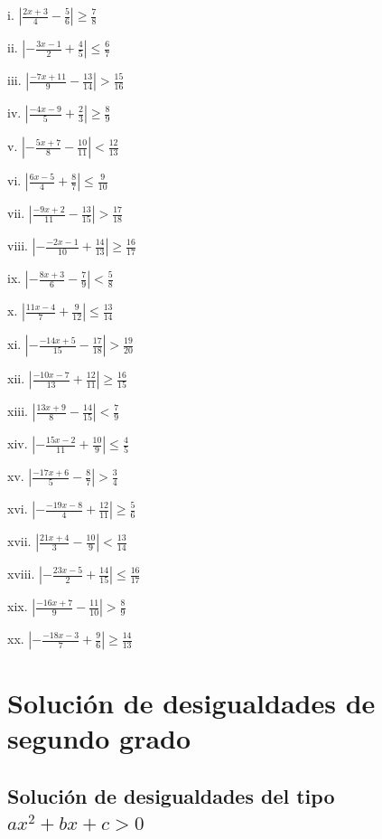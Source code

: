 \documentclass[]{book}
\begin{document}
\begin{multicols}{2}
    i. $|\frac{2x+3}{4}-\frac{5}{6}| \geq \frac{7}{8}$
    
    ii. $|-\frac{3x-1}{2}+\frac{4}{5}| \leq \frac{6}{7}$
    
    iii. $|\frac{-7x+11}{9}-\frac{13}{14}| > \frac{15}{16}$
    
    iv. $|\frac{-4x-9}{5}+\frac{2}{3}| \geq \frac{8}{9}$
    
    v. $|-\frac{5x+7}{8}-\frac{10}{11}| < \frac{12}{13}$
    
    vi. $|\frac{6x-5}{4}+\frac{8}{7}| \leq \frac{9}{10}$
    
    vii. $|\frac{-9x+2}{11}-\frac{13}{15}| > \frac{17}{18}$
    
    viii. $|-\frac{-2x-1}{10}+\frac{14}{13}| \geq \frac{16}{17}$
    
    ix. $|-\frac{8x+3}{6}-\frac{7}{9}| < \frac{5}{8}$
    
    x. $|\frac{11x-4}{7}+\frac{9}{12}| \leq \frac{13}{14}$
    
    xi. $|-\frac{-14x+5}{15}-\frac{17}{18}| > \frac{19}{20}$
    
    xii. $|\frac{-10x-7}{13}+\frac{12}{11}| \geq \frac{16}{15}$
    
    xiii. $|\frac{13x+9}{8}-\frac{14}{15}| < \frac{7}{9}$
    
    xiv. $|-\frac{15x-2}{11}+\frac{10}{9}| \leq \frac{4}{5}$
    
    xv. $|\frac{-17x+6}{5}-\frac{8}{7}| > \frac{3}{4}$
    
    xvi. $|-\frac{-19x-8}{4}+\frac{12}{11}| \geq \frac{5}{6}$
    
    xvii. $|\frac{21x+4}{3}-\frac{10}{9}| < \frac{13}{14}$
    
    xviii. $|-\frac{23x-5}{2}+\frac{14}{15}| \leq \frac{16}{17}$
    
    xix. $|\frac{-16x+7}{9}-\frac{11}{10}| > \frac{8}{9}$
    
    xx. $|-\frac{-18x-3}{7}+\frac{9}{6}| \geq \frac{14}{13}$
\end{multicols}

\section{Solución de desigualdades de segundo
grado}\label{soluciuxf3n-de-desigualdades-de-segundo-grado}

\subsection{\texorpdfstring{Solución de desigualdades del tipo
\(ax^2+bx+c>0\)}{Solución de desigualdades del tipo ax\^{}2+bx+c\textgreater{}0}}\label{soluciuxf3n-de-desigualdades-del-tipo-ax2bxc0}
\end{document}
